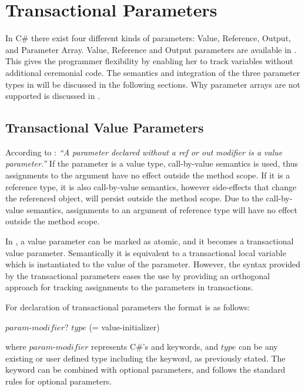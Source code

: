 \section{Transactional Parameters}\label{sec:parameter_design}
In C\# there exist four different kinds of parameters: Value, Reference, Output, and Parameter Array.  Value, Reference and Output  parameters  are available in  \stmnamesp. This gives the programmer flexibility by enabling her to track variables without additional ceremonial code. The semantics and integration of the three parameter types in \stmnamesp will be discussed in the following sections. Why  parameter arrays are not supported is discussed in .

\subsection{Transactional Value Parameters}
\label{subsec:stm_desgin_value_parameters}
According to \cite[p. 97]{csharp2013specificaiton}: \textit{``A parameter declared without a ref or out modifier is a value parameter.''} If the parameter is a value type, call-by-value semantics is used, thus assignments to the argument have no effect outside the method scope. If it is a reference type, it is also call-by-value semantics, however side-effects that change the referenced object, will persist outside the method scope. Due to the call-by-value semantics, assignments to an argument of reference type will have no effect outside the method scope\cite[p. 76]{sestoft2011c}.

In \stmname, a value parameter can be marked as atomic, and it becomes a transactional value parameter. Semantically it is equivalent to a transactional local variable which is instantiated to the value of the parameter\cite[p. 76]{sestoft2011c}. However, the syntax provided by the transactional parameters eases the use by providing an orthogonal approach for tracking assignments to the parameters in transactions.

For declaration of transactional parameters the format is as follows:

 $param$-$modifier$? $type$  (= value-initializer)

where $param$-$modifier$ represents C\#'s  and  keywords, and $type$ can be any existing or user defined type including the  keyword, as previously stated. The  keyword can be combined with optional parameters, and follows the standard rules for optional parameters\cite[p. 46-47]{sestoft2011c}.

